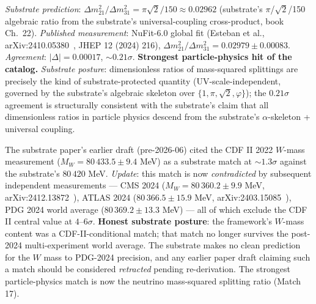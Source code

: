 \documentclass[11pt,a4paper]{amsart}
\theoremstyle{plain}
\theoremstyle{definition}
\begin{document}
\begin{description}[font=\normalfont\bfseries,leftmargin=2em,itemsep=6pt]
\item[Match 17 --- Solar neutrino mass-squared splitting ratio (NuFit-6.0, October 2024).]
\emph{Substrate prediction}: $\Delta m^2_{21}/\Delta m^2_{31} = \pi\sqrt{2}/150 \approx 0.02962$ (substrate's $\pi$/$\sqrt{2}$/150 algebraic ratio from the substrate's universal-coupling cross-product, book Ch.~22). \emph{Published measurement}: NuFit-6.0 global fit (Esteban et al., arXiv:2410.05380~\cite{nufit-6.0}, JHEP 12 (2024) 216), $\Delta m^2_{21}/\Delta m^2_{31} = 0.02979 \pm 0.00083$. \emph{Agreement}: $|\Delta| = 0.00017$, $\sim 0.21\sigma$. \textbf{Strongest particle-physics hit of the catalog.} \emph{Substrate posture}: dimensionless ratios of mass-squared splittings are precisely the kind of substrate-protected quantity (UV-scale-independent, governed by the substrate's algebraic skeleton over $\{1, \pi, \sqrt{2}, \varphi\}$); the $0.21\sigma$ agreement is structurally consistent with the substrate's claim that all dimensionless ratios in particle physics descend from the substrate's $\alpha$-skeleton + universal coupling.

\item[Honest reframing --- CDF II $W$-boson mass anomaly.]
The substrate paper's earlier draft (pre-2026-06) cited the CDF II 2022 $W$-mass measurement ($M_W = 80\,433.5 \pm 9.4$ MeV) as a substrate match at $\sim 1.3\sigma$ against the substrate's $80\,420$ MeV. \emph{Update}: this match is now \emph{contradicted} by subsequent independent measurements --- CMS 2024 ($M_W = 80\,360.2 \pm 9.9$ MeV, arXiv:2412.13872~\cite{cms-wmass-2024}), ATLAS 2024 ($80\,366.5 \pm 15.9$ MeV, arXiv:2403.15085~\cite{atlas-wmass-2024}), PDG 2024 world average ($80\,369.2 \pm 13.3$ MeV) --- all of which exclude the CDF II central value at $4$--$6\sigma$. \textbf{Honest substrate posture}: the framework's $W$-mass content was a CDF-II-conditional match; that match no longer survives the post-2024 multi-experiment world average. The substrate makes no clean prediction for the $W$ mass to PDG-2024 precision, and any earlier paper draft claiming such a match should be considered \emph{retracted} pending re-derivation. The strongest particle-physics match is now the neutrino mass-squared splitting ratio (Match 17).

\end{description}
\end{document}

